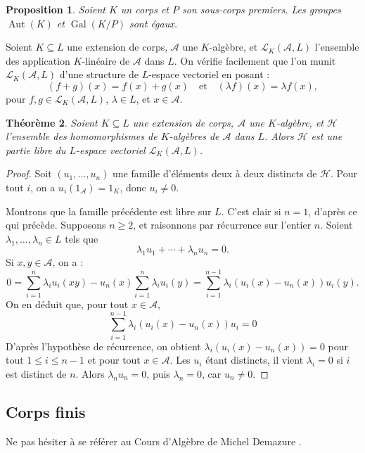 \documentclass[a4paper, titlepage]{article}
\newtheorem{theo}{Théorème}[section]
\newtheorem{prop}[theo]{Proposition}
\theoremstyle{definition}
\theoremstyle{remark}
\def\aut{\operatorname{Aut}}
\def\gal{\operatorname{Gal}}
\begin{document}
\begin{prop}
Soient $K$ un corps et $P$ son sous-corps premiers. Les groupes $\aut(K)$ et $\gal(K/P)$ sont égaux.
\end{prop}

Soient $K \subseteq L$ une extension de corps, $\mathcal{A}$ une $K$-algèbre, et $\mathcal{L}_K(\mathcal{A}, L)$ l'ensemble des application $K$-linéaire de $\mathcal{A}$ dans $L$. On vérifie facilement que l'on munit $\mathcal{L}_K(\mathcal{A}, L)$ d'une structure de $L$-espace vectoriel en posant :
$$(f+g)(x) = f(x)+g(x) \quad\text{et}\quad (\lambda f)(x) = \lambda f(x),$$
pour $f, g \in \mathcal{L}_K(\mathcal{A},L)$, $\lambda \in L$, et $x \in \mathcal{A}$.

\begin{theo}
Soient $K \subseteq L$ une extension de corps, $\mathcal{A}$ une $K$-algèbre, et $\mathcal{H}$ l'ensemble des homomorphismes de $K$-algèbres de $\mathcal{A}$ dans $L$. Alors $\mathcal{H}$ est une partie libre du $L$-espace vectoriel $\mathcal{L}_K(\mathcal{A}, L)$.
\end{theo}

\begin{proof}
Soit $(u_1, \dots, u_n)$ une famille d'éléments deux à deux distincts de $\mathcal{H}$. Pour tout $i$, on a $u_i(1_\mathcal{A}) = 1_K$, donc $u_i \neq 0$.

Montrons que la famille précédente est libre sur $L$. C'est clair si $n = 1$, d'après ce qui précède. Supposons $n \geqslant 2$, et raisonnons par récurrence sur l'entier $n$.
Soient $\lambda_1, \dots,\lambda _n \in L$ tels que 
$$\lambda_1 u_1 + \cdots + \lambda_n u_n = 0.$$
Si $x,y \in \mathcal{A}$, on a :
$$0 = \sum_{i=1}^n \lambda_i u_i(xy) - u_n(x)\sum_{i=1}^n \lambda_i u_i(y) = \sum_{i=1}^{n-1} \lambda_i \left(u_i(x) - u_n(x)\right)u_i(y).$$
On en déduit que, pour tout $x\in\mathcal{A}$,
$$\sum_{i=1}^{n-1}\lambda_i(u_i(x)-u_n(x)) u_i = 0$$
D'après l'hypothèse de récurrence, on obtient $\lambda_i(u_i(x)-u_n(x)) = 0$ pour tout $1 \leqslant i\leqslant n-1$ et pour tout $x\in \mathcal A$. Les $u_i$ étant distincts, il vient $\lambda_i = 0$ si $i$ est distinct de $n$. Alors $\lambda_nu_n = 0$, puis $\lambda_n =0$, car $u_n \neq 0$.
\end{proof}

\subsection{Corps finis}

Ne pas hésiter à se référer au Cours d'Algèbre de Michel Demazure \cite{demazure2008}.
\end{document}
